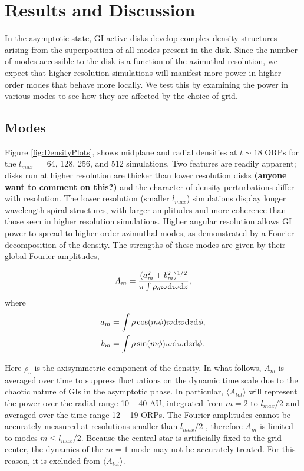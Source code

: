 \documentclass[manuscript]{aastex} %
\begin{document}

\section{Results and Discussion}
	
In the asymptotic state, GI-active disks develop complex density structures arising from the superposition of
all modes present in the disk.  Since the number of modes accessible to the disk is a function of the azimuthal resolution, we expect that higher resolution simulations will manifest more power in higher-order modes 
that behave more locally. We test this by examining the power in various modes to see how they are affected by the choice of grid.

\subsection{Modes}
	
Figure \ref{fig:DensityPlots}, shows midplane and radial densities  at $t \sim 18$ ORPs for the $l_{max} =$ 64, 128, 256, and 512 simulations. Two features are readily apparent; disks run at higher resolution are thicker than lower resolution disks {\bf (anyone want to comment on this?)} and the character of density perturbations differ with resolution.
The lower resolution (smaller $l_{max}$) simulations display longer wavelength spiral structures, with larger amplitudes and more coherence than those seen in higher resolution simulations. Higher angular resolution allows GI power to spread to higher-order azimuthal modes, as demonstrated by a Fourier decomposition of the density. The strengths of these modes are given by their global Fourier amplitudes,

\begin{equation}
A_m = \frac{(a_m^2 + b_m^2)^{1/2}}{\pi\int\rho_o \varpi {\rm d}\varpi {\rm d}z},
\end{equation}
where
\begin{subequations}
\begin{align}
a_m &= \int \rho \cos(m\phi)\varpi {\rm d}\varpi {\rm d}z {\rm d}\phi,\\
b_m &=\int \rho \sin(m\phi)\varpi {\rm d}\varpi {\rm d}z {\rm d}\phi.
\end{align}
\end{subequations}


Here  $\rho_o$ is the axisymmetric component of the density. In what follows, $A_m$ is averaged over time to suppress fluctuations on the dynamic time scale due to the chaotic nature of GIs in the asymptotic  phase.
In particular, $\langle A_{tot} \rangle$ will represent the power over the radial range 10 -- 40 AU, integrated from $ m = 2$ to $l_{max}/2$ and averaged over the time range 12 -- 19 ORPs. The Fourier amplitudes cannot be accurately measured at resolutions smaller than $l_{max}/2$ \citep{shannon1984}, therefore $A_m$ is limited to modes $m \le l_{max}/2$.  
Because the central star is artificially fixed to the grid center, the dynamics of the $m=1$ mode may not
be accurately treated. For this reason, it is excluded from $\langle A_{tot} \rangle$.
\end{document}
